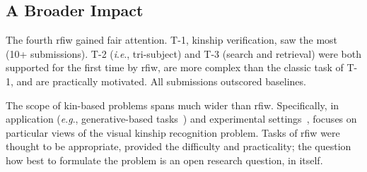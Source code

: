 \documentclass[letterpaper, 10 pt, conference]{ieeeconf}
\newcommand{\ie}{\textit{i}.\textit{e}., }
\newcommand{\eg}{\textit{e}.\textit{g}., }
\begin{document}
\subsection{A Broader Impact}


The fourth \ac{rfiw} gained fair attention. %
T-1, kinship verification, saw the most (10+ submissions). T-2 (\ie tri-subject) and T-3 (search and retrieval) were both supported for the first time by \ac{rfiw}, are more complex than the classic task of T-1, and are practically motivated. All submissions outscored baselines. 


The scope of kin-based problems spans much wider than \ac{rfiw}. Specifically, in application (\eg generative-based tasks~\cite{gao2019will, ozkan2018kinshipgan}) and experimental settings~\cite{mingaaai2020}, focuses on particular views of the visual kinship recognition problem. Tasks of \ac{rfiw} were thought to be appropriate, provided the difficulty and practicality; the question how best to formulate the problem is an open research question, in itself. 


\end{document}

